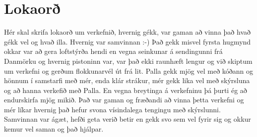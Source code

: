 \section{Lokaorð}
Hér skal skrifa lokaorð um verkefnið, hvernig gékk, var gaman að vinna það hvað gékk vel og hvað illa. Hvernig var samvinnan :-)
Það gekk misvel fyrsta hugmynd okkar var að gera loftstýrða hendi en vegna seinkunar á sendingunni frá Danmörku og hvernig pistoninn var, var það ekki raunhæft lengur og við skiptum um verkefni og gerðum flokkunarvél út frá lit.
Palla gekk mjög vel með kóðann og hönnum í samstarfi með mér, enda klár strákur, mér gekk lika vel með skýrsluna og að hanna verkefið með Palla. En vegna breytinga á verkefninu þá þurti ég að endurskirfa mjög mikið. Það var gaman og fræðandi að vinna þetta verkefni og mér líkar hvernig það hefur svona vísindalega tengingu með skýrslunni. Samvinnan var ágæt, hefði geta verið betir en gekk svo sem vel fyrir sig og okkur kemur vel saman og það hjálpar.
\cite{brock}
